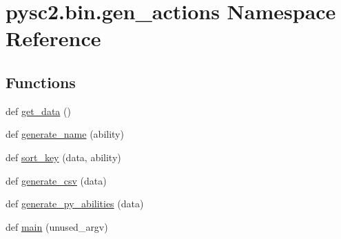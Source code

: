 \hypertarget{namespacepysc2_1_1bin_1_1gen__actions}{}\section{pysc2.\+bin.\+gen\+\_\+actions Namespace Reference}
\label{namespacepysc2_1_1bin_1_1gen__actions}
\subsection*{Functions}
\begin{DoxyCompactItemize}
\item 
def \mbox{\hyperlink{namespacepysc2_1_1bin_1_1gen__actions_a9090887c898a2c4409b89c99fbb99923}{get\+\_\+data}} ()
\item 
def \mbox{\hyperlink{namespacepysc2_1_1bin_1_1gen__actions_ae37ff2f0164ef736edd6510ba2aa8447}{generate\+\_\+name}} (ability)
\item 
def \mbox{\hyperlink{namespacepysc2_1_1bin_1_1gen__actions_a47a7b6e94de45d68e5030e9c22103d73}{sort\+\_\+key}} (data, ability)
\item 
def \mbox{\hyperlink{namespacepysc2_1_1bin_1_1gen__actions_ae7964605a3f83d58077a0df3aa2c3457}{generate\+\_\+csv}} (data)
\item 
def \mbox{\hyperlink{namespacepysc2_1_1bin_1_1gen__actions_aafeb066969266460340f11b56032cff2}{generate\+\_\+py\+\_\+abilities}} (data)
\item 
def \mbox{\hyperlink{namespacepysc2_1_1bin_1_1gen__actions_a550e27248d0dabe71d49e78780f6ea34}{main}} (unused\+\_\+argv)
\end{DoxyCompactItemize}
